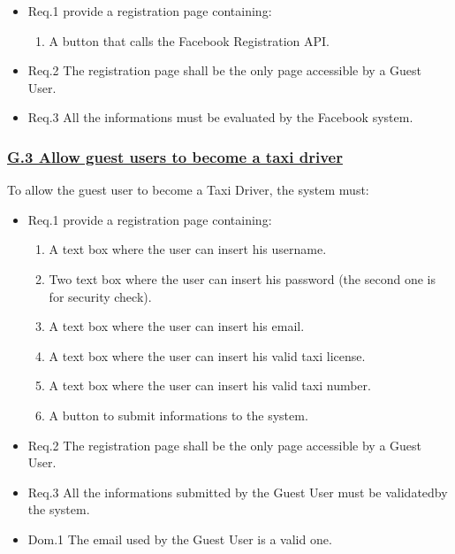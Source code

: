 				\begin{itemize}
					\item \lbrack Req.1\rbrack \label{sec:fr1_g2} provide a registration page containing:
						\begin{enumerate}
							\item A button that calls the Facebook Registration API.
						\end{enumerate}
					\item \lbrack Req.2\rbrack \label{sec:fr2_g2} The registration page shall be the only page accessible by a Guest User.
					\item \lbrack Req.3\rbrack \label{sec:fr3_g2} All the informations must be evaluated by the Facebook system.
				\end{itemize}

			\subsubsection{\lbrack \hyperref[sec:g3]{G.3 Allow guest users to become a taxi driver}\rbrack}\label{sec:frs3}
			To allow the guest user to become a Taxi Driver, the system must:


				\begin{itemize}
					\item \lbrack Req.1\rbrack \label{sec:fr1_g3} provide a registration page containing:
						\begin{enumerate}
							\item A text box where the user can insert his username.
							\item Two text box where the user can insert his password (the second one is for security check).
							\item A text box where the user can insert his email.
							\item A text box where the user can insert his valid taxi license.
							\item A text box where the user can insert his valid taxi number.
							\item A button to submit informations to the system.
						\end{enumerate}
					\item \lbrack Req.2\rbrack \label{sec:fr2_g3} The registration page shall be the only page accessible by a Guest User.
					\item \lbrack Req.3\rbrack \label{sec:fr3_g3} All the informations submitted by the Guest User must be validatedby the system.
					\item \lbrack Dom.1\rbrack \label{sec:da1_g3} The email used by the Guest User is a valid one.
				\end{itemize}

